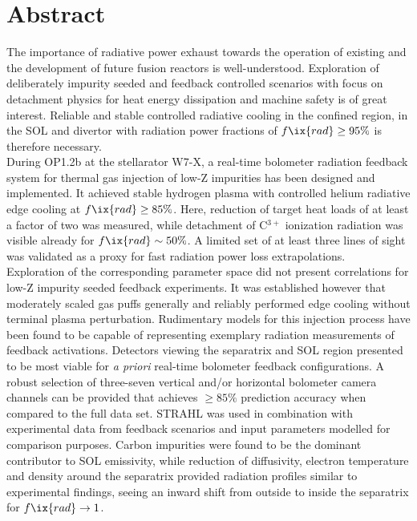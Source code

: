 %
\checkoddpage\ifoddpage\clearpage\else\cleardoublepage\fi%
%
    \chapter*{Abstract}%
%
        The importance of radiative power exhaust towards the operation of existing and the development of future fusion reactors is well-understood. Exploration of deliberately impurity seeded and feedback controlled scenarios with focus on detachment physics for heat energy dissipation and machine safety is of great interest. Reliable and stable controlled radiative cooling in the confined region, in the SOL and divertor with radiation power fractions of $f\ix{rad}\ge95\%$ is therefore necessary.\\%
        During OP1.2b at the stellarator W7-X, a real-time bolometer radiation feedback system for thermal gas injection of low-Z impurities has been designed and implemented. It achieved stable hydrogen plasma with controlled helium radiative edge cooling at $f\ix{rad}\ge85\%$. Here, reduction of target heat loads of at least a factor of two was measured, while detachment of C$^{3+}$ ionization radiation was visible already for $f\ix{rad}\sim50\%$. A limited set of at least three lines of sight was validated as a proxy for fast radiation power loss extrapolations.\\%
        Exploration of the corresponding parameter space did not present correlations for low-Z impurity seeded feedback experiments. It was established however that moderately scaled gas puffs generally and reliably performed edge cooling without terminal plasma perturbation. Rudimentary models for this injection process have been found to be capable of representing exemplary radiation measurements of feedback activations. Detectors viewing the separatrix and SOL region presented to be most viable for \textit{a priori} real-time bolometer feedback configurations. A robust selection of three-seven vertical and/or horizontal bolometer camera channels can be provided that achieves $\ge85\%$ prediction accuracy when compared to the full data set. STRAHL was used in combination with experimental data from feedback scenarios and input parameters modelled for comparison purposes. Carbon impurities were found to be the dominant contributor to SOL emissivity, while reduction of diffusivity, electron temperature and density around the separatrix provided radiation profiles similar to experimental findings, seeing an inward shift from outside to inside the separatrix for $f\ix{rad}\rightarrow1$.\\%
